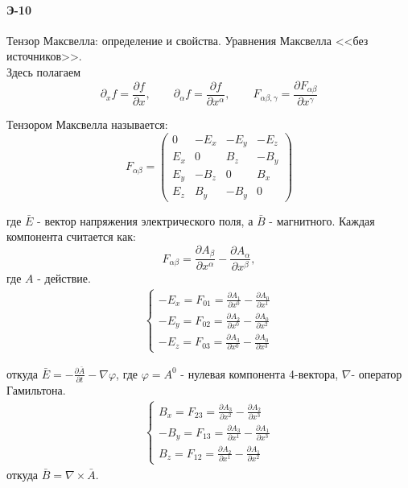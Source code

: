

\paragraph{Э-10}
Тензор Максвелла: определение и свойства. Уравнения Максвелла <<без источников>>.\\

Здесь полагаем
$$
\partial_x f = \frac{\partial f}{\partial x}, \qquad
\partial_\alpha f = \frac{\partial f}{\partial x^\alpha}, \qquad
F_{\alpha\beta,\gamma} = \frac{\partial F_{\alpha\beta}}{\partial x^\gamma}
$$

\begin{definition}
	Тензором Максвелла называется: 
$$F_{\alpha\beta}=
\begin{pmatrix}
0 & -E_x & -E_y & -E_z\\
E_x & 0 & B_z & -B_y\\
E_y & -B_z & 0 & B_x\\
E_z & B_y & -B_y & 0
\end{pmatrix}$$
\end{definition}

где $\bar E$ - вектор напряжения электрического поля, а $\bar B$ - магнитного.
Каждая компонента считается как:
$$
F_{\alpha\beta}=\frac{\partial A_\beta}{\partial x^{\alpha}}
               -\frac{\partial A_\alpha}{\partial x^{\beta}},
$$
где $A$ - действие.
\begin{gather}
\begin{cases}
	-E_x=F_{01}=\frac{\partial A_1}{\partial x^{0}}-\frac{\partial A_0}{\partial x^{1}}\\
	-E_y=F_{02}=\frac{\partial A_2}{\partial x^{0}}-\frac{\partial A_0}{\partial x^{2}}\\
	-E_z=F_{03}=\frac{\partial A_3}{\partial x^{0}}-\frac{\partial A_0}{\partial x^{3}}
\end{cases}
\end{gather}

откуда $\bar{E}=-\frac{\partial\bar{ A}}{\partial t}-\nabla\varphi$, где $\varphi= A^0$ - нулевая компонента 4-вектора, $\nabla$- оператор Гамильтона.
\begin{gather}
	\begin{cases}
		B_x=F_{23}=\frac{\partial A_3}{\partial x^{2}}-\frac{\partial A_2}{\partial x^{3}}\\
		-B_y=F_{13}=\frac{\partial A_3}{\partial x^{1}}-\frac{\partial A_1}{\partial x^{3}}\\
		B_z=F_{12}=\frac{\partial A_2}{\partial x^{1}}-\frac{\partial A_1}{\partial x^{2}}
	\end{cases}
\end{gather}
откуда $\bar{B}=\nabla\times\bar{ A}$.


